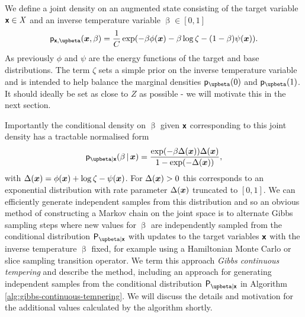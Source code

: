 We define a joint density on an augmented state consisting of the target variable $\boldsymbol{\mathsf{x}} \in \mathit{X}$ and an inverse temperature variable $\upbeta \in [0,1]$
\begin{equation}
\label{eq:ct-joint-target-density}
\pden{\rvct{x},\upbeta}(\vct{x},\beta) =
\frac{1}{C} \exp\lpa -\beta\phi(\vct{x}) -\beta\log\zeta -(1-\beta)\psi(\vct{x})\rpa.
\end{equation}
As previously $\phi$ and $\psi$ are the energy functions of the target and base distributions. The term $\zeta$ sets a simple prior on the inverse temperature variable and is intended to help balance the marginal densities $\pden{\upbeta}(0)$ and $\pden{\upbeta}(1)$. It should ideally be set as close to $Z$ as possible - we will motivate this in the next section.%

Importantly the conditional density on $\upbeta$ given $\boldsymbol{\mathsf{x}}$ corresponding to this joint density has a tractable normalised form
\begin{equation}\label{eq:ct-beta-gvn-x-density}
\pden{\upbeta|\rvct{x}}(\beta \gvn\vct{x}) = 
\frac{\exp\lpa - \beta\Delta(\vct{x})\rpa\Delta(\vct{x})}{1 - \exp\lpa-\Delta(\vct{x})\rpa},
\end{equation}
with $\Delta(\boldsymbol{x}) = \phi(\boldsymbol{x}) + \log\zeta - \psi(\boldsymbol{x})$. For $\Delta(\boldsymbol{x}) > 0$ this corresponds to an exponential distribution with rate parameter $\Delta(\boldsymbol{x})$ truncated to $[0, 1]$.   We can efficiently generate independent samples from this distribution and so an obvious method of constructing a Markov chain on the joint space is to alternate Gibbs sampling steps where new values for $\upbeta$ are independently sampled from the conditional distribution $\prob{\upbeta|\rvct{x}}$ with updates to the target variables $\boldsymbol{\mathsf{x}}$ with the inverse temperature $\upbeta$ fixed, for example using a Hamiltonian Monte Carlo or slice sampling transition operator. We term this approach \emph{Gibbs continuous tempering} and describe the method, including an approach for generating independent samples from the conditional distribution $\prob{\upbeta|\rvct{x}}$ in Algorithm \ref{alg:gibbs-continuous-tempering}. We will discuss the details and motivation for the additional values calculated by the algorithm shortly.

